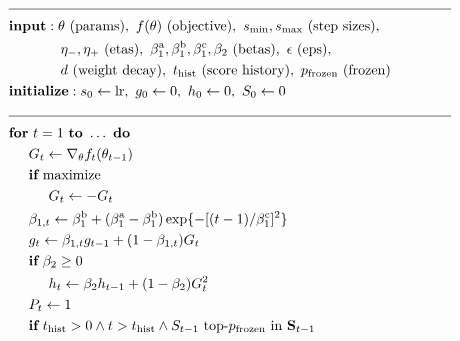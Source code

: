 \documentclass[11pt,a4paper]{article}
\begin{document}
$$
\begin{aligned}
    &\rule{111mm}{0.4pt} \\
    &\textbf{input} : \theta\ \text{(params)},\ f(\theta)\ \text{(objective)},
                      \ s_\mathrm{min},s_\mathrm{max}\ \text{(step sizes)}, \\
    &\hspace{13mm} \eta_-,\eta_+\ \text{(etas)},
                   \ \beta_1^\mathrm{a},\beta_1^\mathrm{b},\beta_1^\mathrm{c},\beta_2
                   \ \text{(betas)},\ \epsilon\ \text{(eps)}, \\
    &\hspace{13mm} d\ \text{(weight decay)},\ t_\mathrm{hist}\ \text{(score history)},
                   \ p_\mathrm{frozen}\ \text{(frozen)} \\
    &\textbf{initialize} : s_0 \leftarrow \text{lr},\ g_0 \leftarrow 0,\ h_0 \leftarrow 0,\ S_0 \leftarrow 0 \\
    &\rule{111mm}{0.4pt} \\
    &\textbf{for}\ t=1\ \textbf{to}\ \ldots\ \textbf{do} \\
    &\hspace{5mm} G_t \leftarrow \nabla_{\theta}f_t(\theta_{t-1})\\
    &\hspace{5mm} \textbf{if}\ \text{maximize} \\
    &\hspace{10mm} G_t \leftarrow -G_t\\
    &\hspace{5mm} \beta_{1,t} \leftarrow \beta_1^\mathrm{b} + (\beta_1^\mathrm{a}-\beta_1^\mathrm{b})\,
                  \mathrm{exp}\{-[(t-1)/\beta_1^\mathrm{c}]^2\}\\
    &\hspace{5mm} g_t \leftarrow \beta_{1,t} g_{t-1} + (1-\beta_{1,t}) G_t \\
    &\hspace{5mm} \textbf{if}\ \beta_2 \geq 0 \\
    &\hspace{10mm} h_t \leftarrow \beta_2 h_{t-1} + (1-\beta_2) G_t^2 \\
    &\hspace{5mm} P_t \leftarrow 1 \\
    &\hspace{5mm} \textbf{if}\ t_\mathrm{hist}>0 \land t>t_\mathrm{hist}
                  \land S_{t-1}\ \mathrm{top}\text{-}p_\mathrm{frozen}\ \mathrm{in}\ \mathbf{S}_{t-1}\\

\end{aligned}$$
\end{document}
